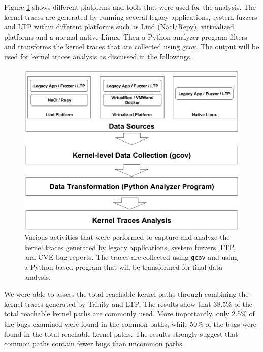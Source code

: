 Figure \ref{fig:datacollection} shows different platforms and tools that were used for the analysis. The kernel traces are generated by running several legacy applications, system fuzzers and LTP within different platforms such as Lind (Nacl/Repy), virtualized platforms and a normal native Linux. Then a Python analyzer program filters and transforms the kernel traces that are collected using gcov. The output will be used for kernel traces analysis as discussed in the followings.

\begin{figure}%
\centering
\includegraphics[width=1.0\columnwidth]{diagram/data_collection.png}
\caption{Various activities that were performed to capture and analyze the kernel traces generated by legacy applications, system fuzzers, LTP, and CVE bug reports. The traces are collected using \texttt{gcov} and using a Python-based program that will be transformed for final data analysis.} 
\label{fig:datacollection}
\end{figure}



We were able to assess
the total reachable kernel paths through combining the kernel traces generated by Trinity and LTP. The results show that 38.5\% of the total reachable
kernel paths are commonly used. 
More importantly, only 2.5\% of the bugs examined were found in the common
paths, 
while 50\% of the bugs were found in the total reachable kernel paths. 
The results strongly suggest that common paths contain fewer bugs than uncommon
paths.  

